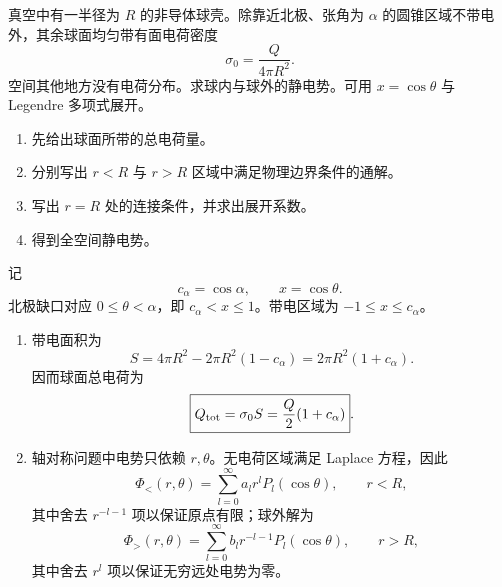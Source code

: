 

\begin{question}[带缺口均匀带电球壳的静电势]
真空中有一半径为 $R$ 的非导体球壳。除靠近北极、张角为 $\alpha$ 的圆锥区域不带电外，其余球面均匀带有面电荷密度
\[
  \sigma_0=\frac{Q}{4\pi R^2} .
\]
空间其他地方没有电荷分布。求球内与球外的静电势。可用 $x=\cos\theta$ 与 Legendre 多项式展开。
\begin{enumerate}
  \item 先给出球面所带的总电荷量。
  \item 分别写出 $r<R$ 与 $r>R$ 区域中满足物理边界条件的通解。
  \item 写出 $r=R$ 处的连接条件，并求出展开系数。
  \item 得到全空间静电势。
\end{enumerate}
\begin{solution}
记
\[
  c_\alpha=\cos\alpha,
  \qquad x=\cos\theta .
\]
北极缺口对应 $0\leq\theta<\alpha$，即 $c_\alpha<x\leq1$。带电区域为 $-1\leq x\leq c_\alpha$。
\begin{enumerate}
  \item 带电面积为
  \[
    S=4\pi R^2-2\pi R^2(1-c_\alpha)=2\pi R^2(1+c_\alpha) .
  \]
  因而球面总电荷为
  \[
    \boxed{Q_{\rm tot}=\sigma_0S=\frac{Q}{2}(1+c_\alpha)} .
  \]

  \item 轴对称问题中电势只依赖 $r,\theta$。无电荷区域满足 Laplace 方程，因此
  \[
    \Phi_<(r,\theta)=\sum_{l=0}^{\infty}a_lr^lP_l(\cos\theta),
    \qquad r<R,
  \]
  其中舍去 $r^{-l-1}$ 项以保证原点有限；球外解为
  \[
    \Phi_>(r,\theta)=\sum_{l=0}^{\infty}b_lr^{-l-1}P_l(\cos\theta),
    \qquad r>R,
  \]
  其中舍去 $r^l$ 项以保证无穷远处电势为零。


\end{enumerate}
\end{solution}
\end{question}
